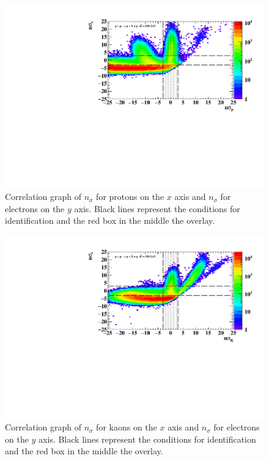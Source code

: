 \FloatBarrier
\begin{figure}[ht]
    \centering
    \includegraphics[width=1\textwidth]{figures/hNSigmaPecorr.pdf}
    \caption[Correlation graph of $n\sigma_{p}$ and $n\sigma_{e}$ of measured particles]{Correlation graph of $n_{\sigma}$ for protons on the $x$ axis and $n_{\sigma}$ for electrons on the $y$ axis. Black lines represent the conditions for identification and the red box in the middle the overlay.}
    \label{a3}
\end{figure}
\FloatBarrier

\FloatBarrier
\begin{figure}[ht]
    \centering
    \includegraphics[width=1\textwidth]{figures/hNSigmaKecorr.pdf}
    \caption[Correlation graph of $n\sigma_{K}$ and $n\sigma_{e}$ of measured particles]{Correlation graph of $n_{\sigma}$ for kaons on the $x$ axis and $n_{\sigma}$ for electrons on the $y$ axis. Black lines represent the conditions for identification and the red box in the middle the overlay.}
    \label{a4}
\end{figure}
\FloatBarrier


